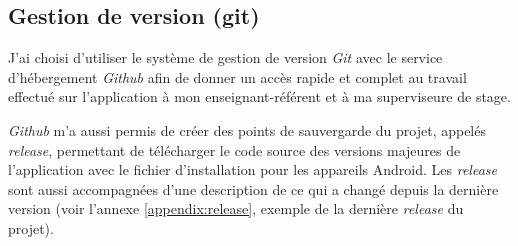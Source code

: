 \subsection{Gestion de version (git)}

J'ai choisi d'utiliser le système de gestion de version \textit{Git} avec le service d'hébergement \textit{Github} afin de donner un accès rapide et complet au travail effectué sur l'application à mon enseignant-référent et à ma superviseure de stage.

\textit{Github} m'a aussi permis de créer des points de sauvergarde du projet, appelés \textit{release}, permettant de télécharger le code source des versions majeures de l'application avec le fichier d'installation pour les appareils Android. Les \textit{release} sont aussi accompagnées d'une description de ce qui a changé depuis la dernière version (voir l'annexe \ref{appendix:release}, exemple de la dernière \textit{release} du projet).











